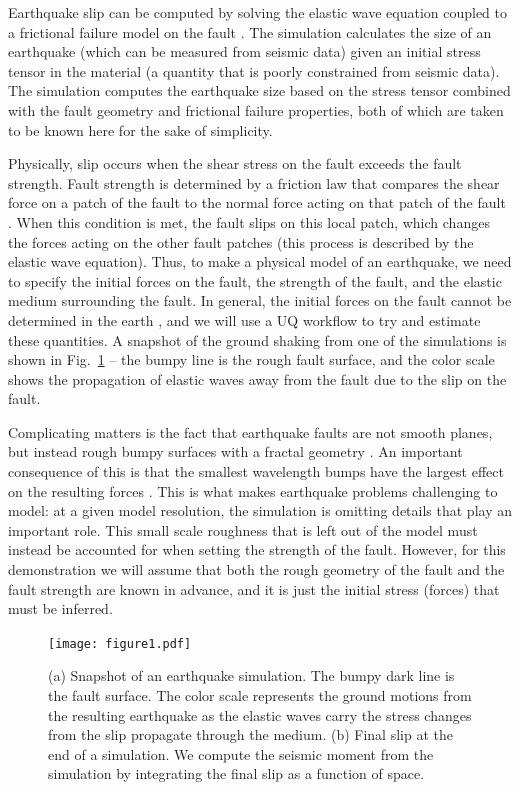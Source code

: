 \documentclass[openacc]{rstransa}%
\begin{document}
Earthquake slip can be computed by solving the elastic wave equation coupled to a frictional failure model
on the fault \cite{earthquakedynamics}. The simulation calculates the size of an earthquake (which can be measured from seismic data) \cite{akirichards}
given an initial stress tensor in the material (a quantity that is poorly constrained from seismic data).
The simulation computes the earthquake size based on the stress tensor combined with the fault geometry and
frictional failure properties, both of which are taken to be known here for the sake of simplicity.

Physically, slip occurs when the shear stress on the fault exceeds the fault strength. Fault strength is
determined by a friction law that compares the shear force on a patch of the fault to the normal force acting
on that patch of the fault \cite{slipweak}. When this condition is met, the fault slips on this local patch, which changes
the forces acting on the other fault patches (this process is described by the elastic wave equation).
Thus, to make a physical model of an earthquake, we need to specify the initial forces on the fault, the
strength of the fault, and the elastic medium surrounding the fault. In general, the initial forces on the
fault cannot be determined in the earth \cite{earthquakemech},
and we will use a UQ workflow to try and estimate these quantities.
A snapshot of the ground shaking from one of the simulations is shown in Fig.~\ref{fig_sim} --
the bumpy line is the rough fault surface, and the color scale shows the propagation of elastic waves away
from the fault due to the slip on the fault.

Complicating matters is the fact that earthquake faults are not smooth planes, but instead rough bumpy surfaces
with a fractal geometry \cite{fractalfault}. An important consequence of this is that the smallest wavelength bumps have the
largest effect on the resulting forces \cite{roughfault}. This is what makes earthquake problems challenging to model: at a given
model resolution, the simulation is omitting details that play an important role. This small scale roughness that is left
out of the model must instead be accounted for when setting the strength of the fault. However, for this
demonstration we will assume that both the rough geometry of the fault and the fault strength are known in
advance, and it is just the initial stress (forces) that must be inferred.

\begin{figure}[!h]
\centering\texttt{[image: figure1.pdf]}
\caption{(a) Snapshot of an earthquake simulation. The bumpy dark line is the fault surface. The color scale represents the ground motions from the resulting earthquake as the elastic waves carry the stress changes from the slip propagate through the medium. (b) Final slip at the end of a simulation. We compute the
seismic moment from the simulation by integrating the final slip as a function of space.}
\label{fig_sim}
\end{figure}
\end{document}
